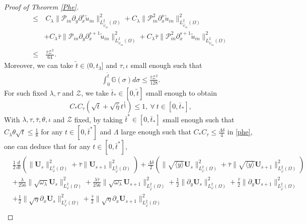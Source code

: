 \documentclass[10pt,a4paper]{amsart}
\newcommand\y{{{\langle y \rangle}}}
\begin{document}
\begin{proof}[Proof of Theorem \ref{Phe}]
\begin{align}
\leq&~C_{\lambda}\|\mathcal{P}_{in}\partial_{y}\partial_{x}^{s}\tilde{u}_{in}\|_{L_{\hat{\psi}_{in}}^{2}(\Omega)}^{2}
     +C_{\lambda}\|\mathcal{P}_{in}^{2}\partial_{x}^{s}\tilde{u}_{in}\|_{L_{\hat{\psi}_{in}}^{2}(\Omega)}^{2}\nonumber\\
    &+C_{\lambda}\bar{\tau}\|\mathcal{P}_{in}\partial_{y}\partial_{x}^{s+1}\tilde{u}_{in}\|_{L_{\check{\psi}_{in}}^{2}(\Omega)}^{2}
     +C_{\lambda}\bar{\tau}\|\mathcal{P}_{in}^{2}\partial_{x}^{s+1}\tilde{u}_{in}\|_{L_{\check{\psi}_{in}}^{2}(\Omega)}^{2}\nonumber\\
\leq&~\frac{\bar{\tau}\mathcal{Z}^{2}}{64}.\nonumber
\end{align}
Moreover, we can take $\tilde{t}\in(0,t_{3}]$ and $\tau, \iota$ small enough such that
\begin{align}\label{G}
\int_{0}^{\tilde{t}}\mathbb{G}(\sigma)d\sigma\leq \frac{\bar{\tau}\mathcal{Z}^{2}}{128}.
\end{align}
For such fixed $\lambda,\tau$ and $\mathcal{Z}$, we take $\bar{t}_{*}\in[0,\tilde{t}]$ small enough to obtain
$$C_{*}C_{\tau}(\sqrt{t}+\sqrt{\bar{\eta}}t^{\frac{1}{4}})\leq 1,~\forall~t\in[0,\bar{t}_{*}],$$
With $\lambda,\tau,\bar{\tau},\theta,\iota$ and $\mathcal{Z}$ fixed, by taking $\bar{t}^{*}\in [0,\bar{t}_{*}]$ small enough such that $C_{\lambda}\theta\sqrt{t}\leq \frac{1}{8}$ for any $t\in[0,\bar{t}^{*}]$ and  $\Lambda$ large enough such that $C_{*}C_{\tau}\leq \frac{\Lambda\delta}{4}$ in \eqref{phe}, one can deduce that for any $t\in[0,\bar{t}^{*}]$,
\begin{align}\label{phe0}
&\frac{1}{2}\frac{d}{dt}\left(\|\mathbf{U}_{s}\|_{L_{\varphi}^{2}(\Omega)}^{2}+\bar{\tau}\|\mathbf{U}_{s+1}\|_{L_{\hat{\varphi}}^{2}(\Omega)}^{2}\right)
 +\frac{\Lambda\delta}{2}\left(\|\sqrt{\y}\mathbf{U}_{s}\|_{L_{\varphi}^{2}(\Omega)}^{2}+\bar{\tau}\|\sqrt{\y}\mathbf{U}_{s+1}\|_{L_{\hat{\varphi}}^{2}(\Omega)}^{2}\right)\\
&+\frac{\lambda}{256}\|\sqrt{\omega_{\lambda}}\mathbf{U}_{s}\|_{L_{\varphi}^{2}(\Omega)}^{2}
 +\frac{\lambda\bar{\tau}}{256}\|\sqrt{\omega_{\lambda}}\mathbf{U}_{s+1}\|_{L_{\hat{\varphi}}^{2}(\Omega)}^{2}
 +\frac{1}{2}\|\partial_{y}\mathbf{U}_{s}\|_{L_{\varphi}^{2}(\Omega)}^{2}
 +\frac{\bar{\tau}}{2}\|\partial_{y}\mathbf{U}_{s+1}\|_{L_{\hat{\varphi}}^{2}(\Omega)}^{2}\nonumber\\
&+\frac{1}{2}\|\sqrt{\eta}\partial_{x}\mathbf{U}_{s}\|_{L_{\varphi}^{2}(\Omega)}^{2}
 +\frac{\bar{\tau}}{2}\|\sqrt{\eta}\partial_{x}\mathbf{U}_{s+1}\|_{L_{\hat{\varphi}}^{2}(\Omega)}^{2}\nonumber\\

\end{align}
\end{proof}
\end{document}
